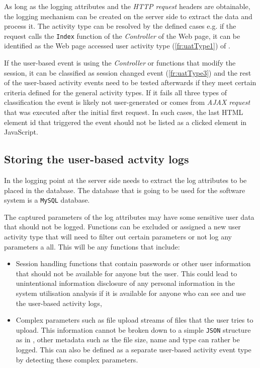 As long as the logging attributes and the \textit{HTTP request} headers are obtainable, the logging mechanism can be created on the server side to extract the data and process it. The activity type can be resolved by the defined cases e.g. if the request calls the \texttt{Index} function of the \textit{Controller} of the Web page, it can be identified as the Web page accessed user activity type (\ref{fr:uatType1}) of .\par If the user-based event is using the \textit{Controller} or functions that modify the session, it can be classified as session changed event (\ref{fr:uatType3}) and the rest of the user-based activity events need to be tested afterwards if they meet certain criteria defined for the general activity types. If it fails all three types of classification the event is likely not user-generated or comes from \textit{AJAX request} that was executed after the initial first request. In such cases, the last HTML element id that triggered the event should not be listed as a clicked element in JavaScript.

\subsection{Storing the user-based actvity logs}
In  the logging point at the server side needs to extract the log attributes to be placed in the database. The database that is going to be used for the software system is a \texttt{MySQL} database.\par The captured parameters of the log attributes may have some sensitive user data that should not be logged. Functions can be excluded or assigned a new user activity type that will need to filter out certain parameters or not log any parameters a all. This will be any functions that include:

\begin{itemize}
	\item Session handling functions that contain passwords or other user information that should not be available for anyone but the user. This could lead to unintentional information disclosure of any personal information in the system utilisation analysis if it is available for anyone who can see and use the user-based activity logs,
	\item Complex parameters such as file upload streams of files that the user tries to upload. This information cannot be broken down to a simple \texttt{JSON} structure as in , other metadata such as the file size, name and type can rather be logged. This can also be defined as a separate user-based activity event type by detecting these complex parameters.
\end{itemize}

